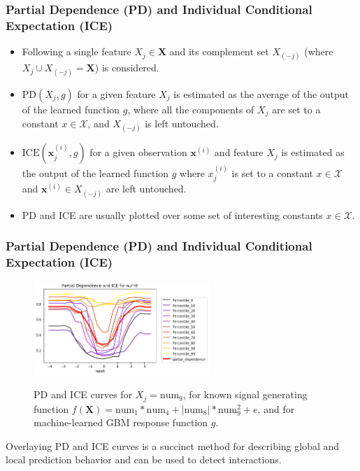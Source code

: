 \documentclass[11pt,
               aspectratio=169
               ]{beamer}
\begin{document}
		\begin{frame}
		
			\frametitle{Partial Dependence (PD) and Individual Conditional Expectation (ICE)}
			
				\vspace{-10 pt}
			
				\begin{itemize}
					
					\item Following \cite{esl} a single feature $X_j \in \mathbf{X}$ and its complement set $X_{(-j)}$ (where $X_j \cup X_{(-j)} = \mathbf{X}$) is considered.
					
					\item $\text{PD}(X_j, g)$ for a given feature $X_j$ is estimated as the average of the output of the learned function $g$, where all the components of $X_j$ are set to a constant $x \in \mathcal{X}$, and $X_{(-j)}$ is left untouched.
					
					\item $\text{ICE}(\mathbf{x}^{(i)}_j, g)$ for a given observation $\mathbf{x}^{(i)}$ and feature $X_j$ is estimated as the output of the learned function $g$ where $x^{(i)}_j$ is set to a constant $x \in \mathcal{X}$ and $\mathbf{x}^{(i)} \in X_{(-j)}$ are left untouched.
					
					\item PD and ICE are usually plotted over some set of interesting constants $x \in \mathcal{X}$. 
				
				\end{itemize}
			
		\end{frame}
	
		\begin{frame}[t]
		
			\frametitle{Partial Dependence (PD) and Individual Conditional Expectation (ICE)}
		
			\begin{figure}[htb]
				\begin{center}
					\includegraphics[height=100pt]{img/pdp_ice.png}
					\label{fig:pdp_ice}
					\caption{PD and ICE curves for $ X_j = \text{num}_9$, for known signal generating function $f(\mathbf{X}) = \text{num} _1 * \text{num}_4 + |\text{num}_8| * \text{num}_9^2 + e$, and for machine-learned GBM response function $g$.}
				\end{center}
			\end{figure}
			
			\vspace{-10pt}
			
			Overlaying PD and ICE curves is a succinct method for describing global and local prediction behavior and can be used to detect interactions. \cite{ice_plots} 
			
		\end{frame}
	
\end{document}
